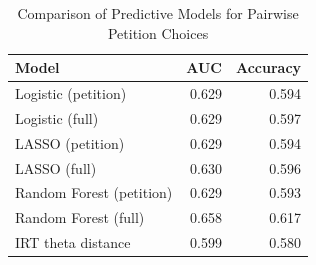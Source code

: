 \begin{table}[ht]
\centering
\begin{tabular}{lrr}
  \toprule
Model & AUC & Accuracy \\ 
  \midrule
Logistic (petition) & 0.629 & 0.594 \\ 
  Logistic (full) & 0.629 & 0.597 \\ 
  LASSO (petition) & 0.629 & 0.594 \\ 
  LASSO (full) & 0.630 & 0.596 \\ 
  Random Forest (petition) & 0.629 & 0.593 \\ 
  Random Forest (full) & 0.658 & 0.617 \\ 
  IRT theta distance & 0.599 & 0.580 \\ 
   \bottomrule
\end{tabular}
\caption{Comparison of Predictive Models for Pairwise Petition Choices} 
\label{tab:model_comparison}
\end{table}

